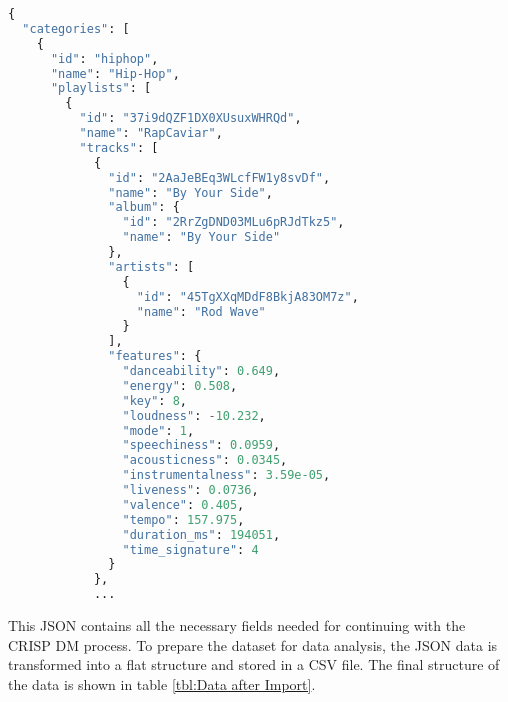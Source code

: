 \begin{lstlisting}[language=Python]
{
  "categories": [
    {
      "id": "hiphop",
      "name": "Hip-Hop",
      "playlists": [
        {
          "id": "37i9dQZF1DX0XUsuxWHRQd",
          "name": "RapCaviar",
          "tracks": [
            {
              "id": "2AaJeBEq3WLcfFW1y8svDf",
              "name": "By Your Side",
              "album": {
                "id": "2RrZgDND03MLu6pRJdTkz5",
                "name": "By Your Side"
              },
              "artists": [
                {
                  "id": "45TgXXqMDdF8BkjA83OM7z",
                  "name": "Rod Wave"
                }
              ],
              "features": {
                "danceability": 0.649,
                "energy": 0.508,
                "key": 8,
                "loudness": -10.232,
                "mode": 1,
                "speechiness": 0.0959,
                "acousticness": 0.0345,
                "instrumentalness": 3.59e-05,
                "liveness": 0.0736,
                "valence": 0.405,
                "tempo": 157.975,
                "duration_ms": 194051,
                "time_signature": 4
              }
            },
            ...
\end{lstlisting}

This JSON contains all the necessary fields needed for continuing with the CRISP DM process.
To prepare the dataset for data analysis, the JSON data is transformed into a flat structure and stored in a CSV file.
The final structure of the data is shown in table \ref{tbl:Data after Import}.

